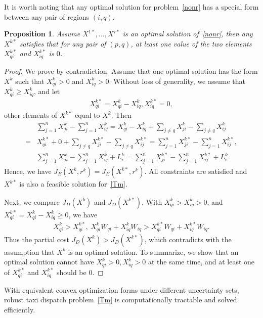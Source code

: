 \documentclass[10pt,twocolumn,twoside,english]{IEEEtran}
\newtheorem{proposition}{Proposition}
\begin{document}
It is worth noting that any optimal solution for problem~\eqref{nonr} has a special form between any pair of regions $(i, q)$.  
\begin{proposition}
Assume $X^{1*}, \dots, X^{\tau*}$ is an optimal solution of~\eqref{nonr}, then any $X^{k*}$ satisfies that for any pair of $(p,q)$, at least one value of the two elements $X^{k*}_{qi}$ and $X^{k*}_{iq}$ is $0$.
\end{proposition}
\begin{proof}
We prove by contradiction. Assume that one optimal solution has the form $X^{k}$ such that $X^{k}_{qi} >0$ and $X^{k}_{iq} >0$. Without loss of generality, we assume that $X^k_{qi} \geq X^k_{iq}$, and let 
\begin{align*}
X^{k*}_{qi} = X^k_{qi}-X^k_{iq},  X^{k*}_{iq}=0,
\end{align*} 
other elements of $X^{k*}$  equal to $X^k$. Then
\begin{align*}
 &\sum_{j=1}^n X^k_{ji}-\sum_{j=1}^n X^k_{ij} 
= X^k_{qi}-X^k_{iq}+\sum_{j \neq q} X^k_{ji} -\sum_{j \neq q} X^k_{ij}\\
= & X^{k*}_{qi} + 0+\sum_{j \neq q} X^{k*}_{ji} -\sum_{j \neq q} X^{k*}_{ij}
= \sum_{j=1}^n X^{k*}_{ji}-\sum_{j=1}^n X^{k*}_{ij},\\
&\sum_{j=1}^n X^k_{ji}-\sum_{j=1}^n X^k_{ij}+ L^k_i=\sum_{j=1}^n X^{k*}_{j i}-\sum_{j=1}^n X^{k*}_{ij}+ L^k_i.
\end{align*}                                                                                 
Hence, we have
$J_E(X^k, r^k)= J_E(X^{k*}, r^k). $
All constraints are satisfied and $X^{k*}$ is also a feasible solution for~\eqref{Tm}.

Next, we compare $J_D(X^k)$ and $ J_D(X^{k*})$. With $X^{k}_{qi}>X^{k}_{iq}>0$, and
$X^{k*}_{qi} = X^k_{qi}-X^k_{iq} \geq 0$, we have
\begin{align*}
X^k_{qi} > X^{k*}_{qi},\ X^{k}_{qi}W_{qi} + X^k_{iq}W_{iq}> X^{k*}_{qi} W_{qi}+X^{k*}_{iq} W_{iq}.
\end{align*}
Thus the partial cost 
$J_D(X^k) > J_D(X^{k*})$,
which contradicts with the assumption that $X^k$ is an optimal solution. To summarize, we show that an optimal solution cannot have $X^k_{qi}>0, X^k_{iq}>0$ at the same time, and at least one of  $X^{k*}_{qi}$ and $X^{k*}_{iq}$ should be $0$.
\end{proof}

With equivalent convex optimization forms under different uncertainty sets, robust taxi dispatch problem~\eqref{Tm} is computationally tractable and solved efficiently.
\end{document}
